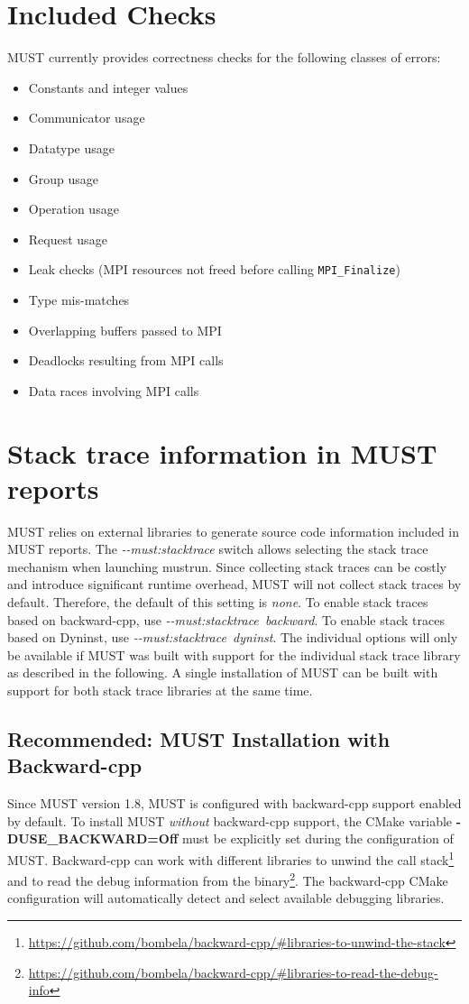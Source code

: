 \documentclass[english]{scrartcl}
\begin{document}
\section{Included Checks}
MUST currently provides correctness checks for the following classes of errors:
\begin{itemize}
  \item Constants and integer values
  \item Communicator usage
  \item Datatype usage
  \item Group usage
  \item Operation usage
  \item Request usage
  \item Leak checks (MPI resources not freed before
  calling \texttt{MPI\_Finalize})
  \item Type mis-matches
  \item Overlapping buffers passed to MPI
  \item Deadlocks resulting from MPI calls
  \item Data races involving MPI calls
\end{itemize}

\section{Stack trace information in MUST reports}
\label{section:stacktrace}
MUST relies on external libraries to generate source code information included in MUST reports. The \emph{\mbox{-{}-must:stacktrace}} switch allows selecting the stack trace mechanism when launching mustrun. Since collecting stack traces can be costly and introduce significant runtime overhead, MUST will not collect stack traces by default. Therefore, the default of this setting is \emph{none}.
To enable stack traces based on backward-cpp, use \emph{\mbox{-{}-must:stacktrace backward}}. 
To enable stack traces based on Dyninst, use \emph{\mbox{-{}-must:stacktrace dyninst}}. 
The individual options will only be available if MUST was built with support for the individual stack trace library as described in the following.
A single installation of MUST can be built with support for both stack trace libraries at the same time.

\subsection{Recommended: MUST Installation with Backward-cpp}
\label{section:backward}
Since MUST version 1.8, MUST is configured with backward-cpp support enabled by default. To install MUST \textit{without} backward-cpp support, the CMake variable \textbf{\mbox{-DUSE\_BACKWARD=Off}} must be explicitly set during the configuration of MUST. Backward-cpp can work with different libraries to unwind the call stack\footnote{\url{https://github.com/bombela/backward-cpp/\#libraries-to-unwind-the-stack}} and to read the debug information from the binary\footnote{\url{https://github.com/bombela/backward-cpp/\#libraries-to-read-the-debug-info}}. The backward-cpp CMake configuration will automatically detect and select available debugging libraries.
\end{document}
